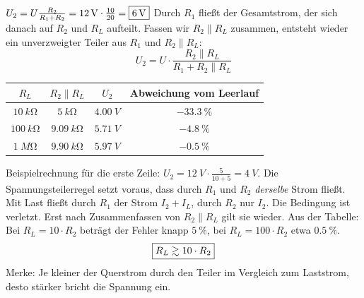 \documentclass[11pt,a4paper]{article}
\begin{document}
\begin{loesung}
$U_2 = U\frac{R_2}{R_1+R_2} = \SI{12}{V}\cdot\frac{10}{20} = \boxed{\SI{6}{V}}$
Durch $R_1$ fließt der Gesamtstrom, der sich danach auf $R_2$ und $R_L$ aufteilt. Fassen wir $R_2\parallel R_L$ zusammen, entsteht wieder ein unverzweigter Teiler aus $R_1$ und $R_2\parallel R_L$:
\[ U_2 = U\cdot\frac{R_2\parallel R_L}{R_1 + R_2\parallel R_L} \]
\begin{center}
\begin{tabular}{cccc}
\toprule
$R_L$ & $R_2\parallel R_L$ & $U_2$ & Abweichung vom Leerlauf\\\midrule
$\SI{10}{k\ohm}$  & $\SI{5}{k\ohm}$     & $\SI{4.00}{V}$ & $\SI{-33.3}{\percent}$\\
$\SI{100}{k\ohm}$ & $\SI{9.09}{k\ohm}$  & $\SI{5.71}{V}$ & $\SI{-4.8}{\percent}$\\
$\SI{1}{M\ohm}$   & $\SI{9.90}{k\ohm}$  & $\SI{5.97}{V}$ & $\SI{-0.5}{\percent}$\\\bottomrule
\end{tabular}
\end{center}
Beispielrechnung für die erste Zeile: $U_2 = \SI{12}{V}\cdot\frac{5}{10+5} = \SI{4}{V}$.
Die Spannungsteilerregel setzt voraus, dass durch $R_1$ und $R_2$ \emph{derselbe} Strom fließt. Mit Last fließt durch $R_1$ der Strom $I_2 + I_L$, durch $R_2$ nur $I_2$. Die Bedingung ist verletzt. Erst nach Zusammenfassen von $R_2\parallel R_L$ gilt sie wieder.
Aus der Tabelle: Bei $R_L = 10\cdot R_2$ beträgt der Fehler knapp $\SI{5}{\percent}$, bei $R_L = 100\cdot R_2$ etwa $\SI{0.5}{\percent}$.
\[ \boxed{R_L \gtrsim 10\cdot R_2} \]
Merke: Je kleiner der Querstrom durch den Teiler im Vergleich zum Laststrom, desto stärker bricht die Spannung ein.
\end{loesung}
\end{document}

